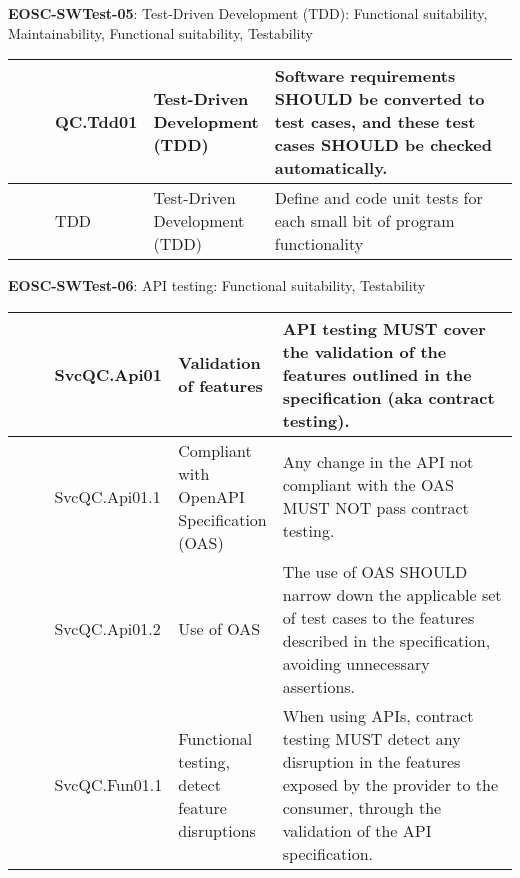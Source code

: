 \textbf{EOSC-SWTest-05}: Test-Driven Development (TDD): Functional suitability, Maintainability, Functional suitability, Testability
\nopagebreak[4]
\begin{center}
    \tabletail{\hline}
    \tiny
    \begin{supertabular}{|p{0.10\linewidth}|p{0.10\linewidth}|p{0.20\linewidth}|p{0.60\linewidth}|} \hline
        \cite{orviz_set_2017} & QC.Tdd01 & Test-Driven Development (TDD) & Software requirements SHOULD be converted to test cases, and these test cases SHOULD be checked automatically.\\ \hline
        \cite{crispin_driving_2006} & TDD & Test-Driven Development (TDD) & Define and code unit tests for each small bit of program functionality\\ \hline
    \end{supertabular}
\end{center}

\textbf{EOSC-SWTest-06}: API testing: Functional suitability, Testability
\nopagebreak[4]
\begin{center}
    \tabletail{\hline}
    \tiny
    \begin{supertabular}{|p{0.10\linewidth}|p{0.10\linewidth}|p{0.20\linewidth}|p{0.60\linewidth}|} \hline
        \cite{orviz_fernandez_eosc-synergy_2020} & SvcQC.Api01 & Validation of features & API testing MUST cover the validation of the features outlined in the specification (aka contract testing).\\ \hline
        \cite{orviz_fernandez_eosc-synergy_2020} & SvcQC.Api01.1 & Compliant with OpenAPI Specification (OAS) & Any change in the API not compliant with the OAS MUST NOT pass contract testing.\\ \hline
        \cite{orviz_fernandez_eosc-synergy_2020} & SvcQC.Api01.2 & Use of OAS & The use of OAS SHOULD narrow down the applicable set of test cases to the features described in the specification, avoiding unnecessary assertions.\\ \hline
        \cite{orviz_fernandez_eosc-synergy_2020} & SvcQC.Fun01.1 & Functional testing, detect feature disruptions & When using APIs, contract testing MUST detect any disruption in the features exposed by the provider to the consumer, through the validation of the API specification.\\ \hline
    \end{supertabular}
\end{center}

